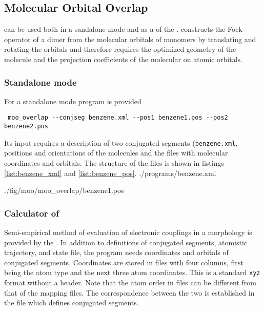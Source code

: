 \subsection{Molecular Orbital Overlap}

\moo can be used both in a sandalone mode and as a \calculator of the \votcactp. \moo constructs the Fock operator of a dimer from the  molecular orbitals of monomers by translating and rotating the orbitals and therefore requires the optimized geometry of the molecule and the projection coefficients of the molecular on atomic orbitals. 


\subsubsection{Standalone mode}
For a standalone mode program \overlap is provided 
\begin{verbatim}
 moo_overlap --conjseg benzene.xml --pos1 benzene1.pos --pos2 benzene2.pos
\end{verbatim}
Its input requires a description of two conjugated segments (\texttt{benzene.xml}, positions and orientations of the molecules and the files with molecular coordinates and orbitals. The structure of the files is shown in listings \ref{list:benzene_xml} and  \ref{list:benzene_pos}.
\vskip 0.1cm
 {./programs/benzene.xml}

\vskip 0.1cm

 {./fig/moo/moo_overlap/benzene1.pos}


\subsubsection{Calculator of \votcactp}
Semi-empirical method of evaluation of electronic couplings in a morphology is provided by the \integrals \calculator. In addition to definitions of conjugated segments, atomistic trajectory, and state file, the program needs coordinates and orbitals of conjugated segments. Coordinates are stored in \xyz files with four columns, first being the atom type and the next three atom coordinates. This is a standard \texttt{xyz} format without a header. Note that the atom order in \xyz files can be different from that of the mapping files. The correspondence between the two is established in the file which defines conjugated segments.
